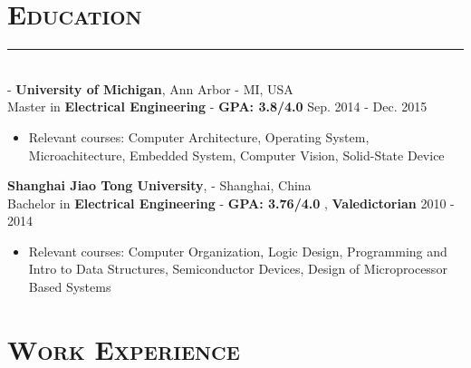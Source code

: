 \documentclass[12pt]{res}
\newcommand{\style}[1]{\color{Blue}\large\textsc{#1}}
\begin{document}
\begin{resume}
\section{\style{Education}}
\vspace{-10pt}
\rule{18cm}{0.5mm}\\
 -\sectionwidth \resumewidth
{\textbf {University of Michigan}, Ann Arbor - MI, USA \\}
{Master in \textbf{Electrical Engineering} - \textbf{GPA: 3.8/4.0}  \hfill Sep. 2014 - Dec. 2015\hspace{-0.58in} \vspace{-0.8mm}\\}
 \vspace{-12pt}
\begin{itemize}[leftmargin=-0.5in]
\item[] Relevant courses: Computer Architecture, Operating System, Microachitecture, Embedded System, Computer Vision, Solid-State Device\\
\end{itemize}
\vspace{-28pt}
{\textbf {Shanghai Jiao Tong University},  - Shanghai, China \\}
{Bachelor in \textbf{Electrical Engineering} - \textbf{GPA: 3.76/4.0} , \textbf{Valedictorian}   \hfill 2010 - 2014\hspace{-0.58in} \vspace{-0.8mm}\\}
 \vspace{-12pt}
\begin{itemize}[leftmargin=-0.5in]
\item[] Relevant courses: Computer Organization, Logic Design, Programming and Intro to Data Structures, Semiconductor Devices, Design of Microprocessor Based Systems\\
\end{itemize}
\vspace{-28pt}

\section{\style{Work Experience}}


\end{resume}
\end{document}
